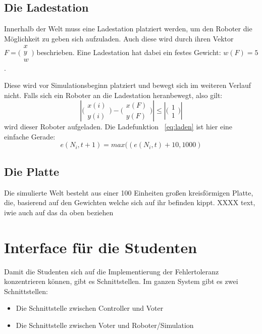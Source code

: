 \subsection{Die Ladestation}\label{fuelstation}
Innerhalb der Welt muss eine Ladestation platziert werden, um den Roboter die M{\"{o}}glichkeit zu geben sich aufzuladen. Auch diese wird durch ihren Vektor $ F = \bigl(\begin{smallmatrix} x \\ y \\ w \end{smallmatrix}\bigr)$ beschrieben. Eine Ladestation hat dabei ein festes Gewicht: $ w(F) = 5 $.

Diese wird vor Simulationsbeginn platziert und bewegt sich im weiteren Verlauf nicht.
Falls sich ein Roboter an die Ladestation heranbewegt, also gilt: 
\begin{equation}
    \label{eq:dist}
 |\bigl(\begin{smallmatrix} x(i) \\ y(i) \end{smallmatrix}\bigr) - \bigl(\begin{smallmatrix} x(F) \\ y(F) \end{smallmatrix}\bigr)| \leq |\bigl(\begin{smallmatrix} 1 \\ 1 \end{smallmatrix}\bigr)|
\end{equation}
wird dieser Roboter aufgeladen. Die Ladefunktion ~\ref{eq:laden} ist hier eine einfache Gerade:
\begin{equation}
    \label{eq:laden}
	e(N_i, t + 1) = max((e(N_i, t) + 10, 1000) 
\end{equation}

\subsection{Die Platte}\label{plate}
Die simulierte Welt besteht aus einer 100 Einheiten gro{\ss}en kreisf{\"{o}}rmigen Platte, die, basierend auf den Gewichten welche sich auf ihr befinden kippt.
XXXX \todo{} text, iwie auch auf das da oben beziehen



\clearpage
\section{Interface f{\"{u}}r die Studenten}\label{interface}
Damit die Studenten sich auf die Implementierung der Fehlertoleranz konzentrieren k{\"{o}}nnen, gibt es Schnittstellen.
Im ganzen System gibt es zwei Schnittstellen:
\begin{itemize}
\item Die Schnittstelle zwischen Controller und Voter
\item Die Schnittstelle zwischen Voter und Roboter/Simulation
\end{itemize}

